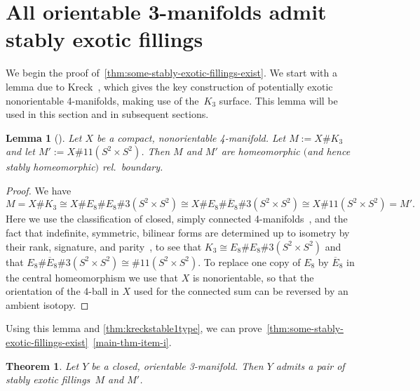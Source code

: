 \documentclass[a4paper, reqno]{amsart}
\newtheorem{theorem}[proposition]{Theorem}
\newtheorem{lemma}[proposition]{Lemma}
\theoremstyle{definition}
\theoremstyle{remark}
\newcommand{\ol}{\overline}
\begin{document}
\section{All orientable 3-manifolds admit stably exotic fillings}\label{section:orientable-case}

We begin the proof of~\cref{thm:some-stably-exotic-fillings-exist}. We start with a lemma due to Kreck~\cite{Kreck84}, which gives the key construction of potentially exotic nonorientable 4-manifolds, making use of the~$K_3$ surface. This lemma will be used in this section and in subsequent sections.

\begin{lemma}[\cite{Kreck84}]\label{lemma:homeomorphic-construction}
    Let $X$ be a compact, nonorientable 4-manifold. Let $M := X\#K_3$ and let $M' :=   X \# 11(S^2 \times S^2)$. Then $M$ and $M'$ are homeomorphic $($and hence stably homeomorphic$)$ rel.\ boundary. 
\end{lemma}


\begin{proof}
We have
\[M = X\#K_3 \cong X\# E_8 \# E_8 \# 3(S^2 \times S^2) \cong X\# E_8 \# \ol{E}_8 \# 3(S^2 \times S^2) \cong X \# 11(S^2 \times S^2) = M'.\]
Here we use the classification of closed, simply connected 4-manifolds~\cite{Freedman-82}, and the fact that indefinite, symmetric, bilinear forms are determined up to isometry by their rank, signature, and parity~\cite{Milnor-Husemoller}, to see that $K_3 \cong  E_8 \# E_8 \# 3(S^2 \times S^2)$ and that $E_8 \# \ol{E}_8 \# 3(S^2 \times S^2) \cong \# 11(S^2 \times S^2)$.    To replace one copy of $E_8$ by $\ol{E}_8$ in the central homeomorphism we use that $X$ is nonorientable, so that the orientation of the 4-ball in $X$ used for the connected sum can be reversed by an ambient isotopy. 
\end{proof}


Using this lemma and \cref{thm:kreckstable1type}, we can prove~\cref{thm:some-stably-exotic-fillings-exist}~\eqref{main-thm-item-i}.

\begin{theorem}\label{thm:orientable-case}
    Let $Y$ be a closed, orientable 3-manifold. Then $Y$ admits a pair of stably exotic fillings~$M$ and $M'$. 
\end{theorem}
\end{document}
